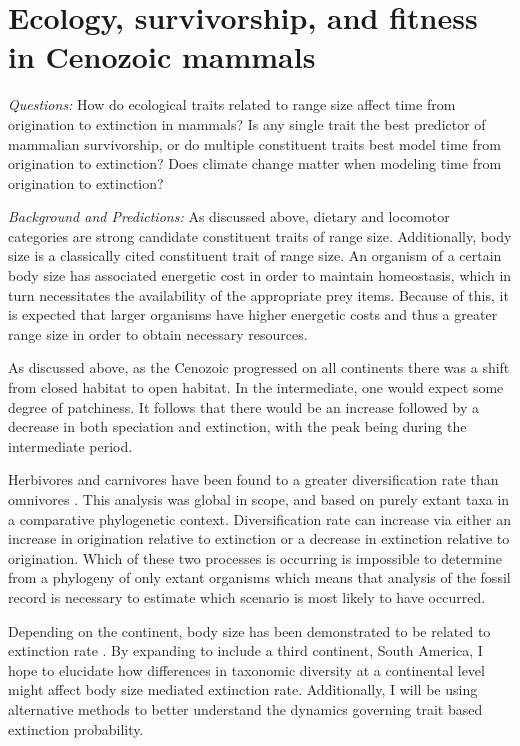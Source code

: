 \documentclass[12pt,letterpaper]{article}
\begin{document}
\section{Ecology, survivorship, and fitness in Cenozoic mammals}

\textit{Questions:} 
How do ecological traits related to range size affect time from origination to extinction in mammals? Is any single trait the best predictor of mammalian survivorship, or do multiple constituent traits best model time from origination to extinction? Does climate change matter when modeling time from origination to extinction?

\textit{Background and Predictions:} 
As discussed above, dietary and locomotor categories are strong candidate constituent traits of range size. Additionally, body size is a classically cited constituent trait of range size. An organism of a certain body size has associated energetic cost in order to maintain homeostasis, which in turn necessitates the availability of the appropriate prey items. Because of this, it is expected that larger organisms have higher energetic costs and thus a greater range size in order to obtain necessary resources. 

As discussed above, as the Cenozoic progressed on all continents there was a shift from closed habitat to open habitat. In the intermediate, one would expect some degree of patchiness. It follows that there would be an increase followed by a decrease in both speciation and extinction, with the peak being during the intermediate period.

Herbivores and carnivores have been found to a greater diversification rate than omnivores \citep{Price2012}. This analysis was global in scope, and based on purely extant taxa in a comparative phylogenetic context. Diversification rate can increase via either an increase in origination relative to extinction or a decrease in extinction relative to origination. Which of these two processes is occurring is impossible to determine from a phylogeny of only extant organisms \citep{Rabosky2010a} which means that analysis of the fossil record is necessary to estimate which scenario is most likely to have occurred. 

Depending on the continent, body size has been demonstrated to be related to extinction rate \citep{Tomiya2013,Liow2008,Liow2009}. By expanding to include a third continent, South America, I hope to elucidate how differences in taxonomic diversity at a continental level might affect body size mediated extinction rate. Additionally, I will be using alternative methods to better understand the dynamics governing trait based extinction probability.
\end{document}
